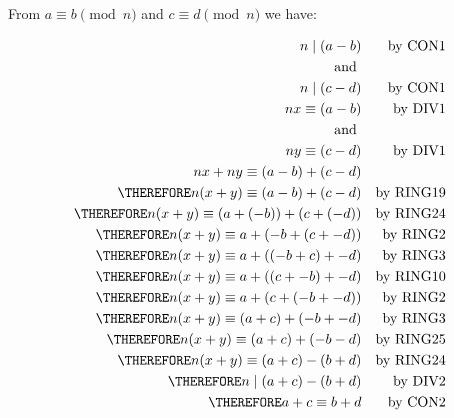 

From $a \equiv b \pmod{n}$ and $c \equiv d \pmod{n}$ we have:

\begin{align*}
n \mid (a-b) && \text{by CON1} \\
\text{ and } \\
n \mid (c-d) && \text{by CON1} \\
nx \equiv (a-b) && \text{by DIV1} \\
\text{ and } \\
ny \equiv (c-d) && \text{by DIV1} \\
nx + ny \equiv (a-b) + (c-d) \\
\THEREFORE n(x + y) \equiv (a-b) + (c-d) && \text{by RING19} \\
\THEREFORE n(x + y) \equiv (a + (-b)) + (c + (-d)) && \text{by RING24} \\
\THEREFORE n(x + y) \equiv a + (-b + (c + -d)) && \text{by RING2} \\
\THEREFORE n(x + y) \equiv a + ((-b + c) + -d) && \text{by RING3} \\
\THEREFORE n(x + y) \equiv a + ((c + -b) + -d) && \text{by RING10} \\
\THEREFORE n(x + y) \equiv a + (c + (-b + -d)) && \text{by RING2} \\
\THEREFORE n(x + y) \equiv (a + c) + (-b + -d) && \text{by RING3} \\
\THEREFORE n(x + y) \equiv (a+c) + (-b-d) && \text{by RING25} \\
\THEREFORE n(x + y) \equiv (a+c) - (b+d) && \text{by RING24} \\
\THEREFORE n \mid (a+c) - (b+d)  && \text{ by DIV2}\\
\THEREFORE a+c \equiv b+d  && \text{by CON2}
\end{align*}
